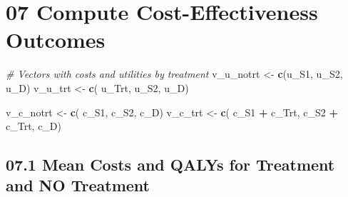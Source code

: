 \documentclass[
]{article}
\newenvironment{Shaded}{\begin{snugshade}}{\end{snugshade}}
\newcommand{\CommentTok}[1]{\textcolor[rgb]{0.56,0.35,0.01}{\textit{#1}}}
\newcommand{\ControlFlowTok}[1]{\textcolor[rgb]{0.13,0.29,0.53}{\textbf{#1}}}
\newcommand{\DataTypeTok}[1]{\textcolor[rgb]{0.13,0.29,0.53}{#1}}
\newcommand{\DecValTok}[1]{\textcolor[rgb]{0.00,0.00,0.81}{#1}}
\newcommand{\KeywordTok}[1]{\textcolor[rgb]{0.13,0.29,0.53}{\textbf{#1}}}
\newcommand{\NormalTok}[1]{#1}
\newcommand{\OperatorTok}[1]{\textcolor[rgb]{0.81,0.36,0.00}{\textbf{#1}}}
\newcommand{\StringTok}[1]{\textcolor[rgb]{0.31,0.60,0.02}{#1}}
\begin{document}
\begin{Shaded}
\end{Shaded}

\hypertarget{compute-cost-effectiveness-outcomes}{%
\section{07 Compute Cost-Effectiveness
Outcomes}\label{compute-cost-effectiveness-outcomes}}

\begin{Shaded}
\begin{Highlighting}[]
\CommentTok{# Vectors with costs and utilities by treatment}
\NormalTok{v_u_notrt   <-}\StringTok{ }\KeywordTok{c}\NormalTok{(u_S1,  u_S2, u_D)}
\NormalTok{v_u_trt     <-}\StringTok{ }\KeywordTok{c}\NormalTok{( u_Trt, u_S2, u_D)}

\NormalTok{v_c_notrt   <-}\StringTok{ }\KeywordTok{c}\NormalTok{( c_S1,         c_S2,         c_D)}
\NormalTok{v_c_trt     <-}\StringTok{ }\KeywordTok{c}\NormalTok{( c_S1 }\OperatorTok{+}\StringTok{ }\NormalTok{c_Trt, c_S2 }\OperatorTok{+}\StringTok{ }\NormalTok{c_Trt, c_D)}
\end{Highlighting}
\end{Shaded}

\hypertarget{mean-costs-and-qalys-for-treatment-and-no-treatment}{%
\subsection{07.1 Mean Costs and QALYs for Treatment and NO
Treatment}\label{mean-costs-and-qalys-for-treatment-and-no-treatment}}

\begin{Shaded}
\end{Shaded}
\end{document}
